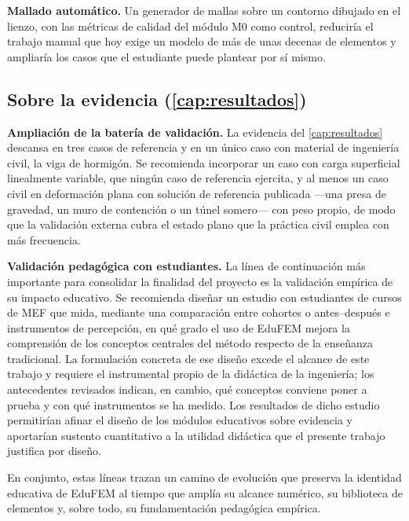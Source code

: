 \textbf{Mallado automático.} Un generador de mallas sobre un contorno dibujado en el lienzo, con las métricas de calidad del módulo M0 como control, reduciría el trabajo manual que hoy exige un modelo de más de unas decenas de elementos y ampliaría los casos que el estudiante puede plantear por sí mismo.

\subsection*{Sobre la evidencia (\autoref{cap:resultados})}

\textbf{Ampliación de la batería de validación.} La evidencia del \autoref{cap:resultados} descansa en tres casos de referencia y en un único caso con material de ingeniería civil, la viga de hormigón. Se recomienda incorporar un caso con carga superficial linealmente variable, que ningún caso de referencia ejercita, y al menos un caso civil en deformación plana con solución de referencia publicada —una presa de gravedad, un muro de contención o un túnel somero— con peso propio, de modo que la validación externa cubra el estado plano que la práctica civil emplea con más frecuencia.

\textbf{Validación pedagógica con estudiantes.} La línea de continuación más importante para consolidar la finalidad del proyecto es la validación empírica de su impacto educativo. Se recomienda diseñar un estudio con estudiantes de cursos de MEF que mida, mediante una comparación entre cohortes o antes--después e instrumentos de percepción, en qué grado el uso de EduFEM mejora la comprensión de los conceptos centrales del método respecto de la enseñanza tradicional. La formulación concreta de ese diseño excede el alcance de este trabajo y requiere el instrumental propio de la didáctica de la ingeniería; los antecedentes revisados \autocite{perezsantiago2023fem,bishay2020teaching,lee2015interactive} indican, en cambio, qué conceptos conviene poner a prueba y con qué instrumentos se ha medido. Los resultados de dicho estudio permitirían afinar el diseño de los módulos educativos sobre evidencia y aportarían sustento cuantitativo a la utilidad didáctica que el presente trabajo justifica por diseño.

En conjunto, estas líneas trazan un camino de evolución que preserva la identidad educativa de EduFEM al tiempo que amplía su alcance numérico, su biblioteca de elementos y, sobre todo, su fundamentación pedagógica empírica.
